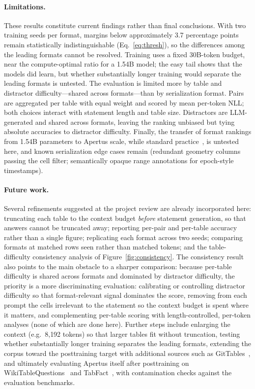 \documentclass[11pt,a4paper]{article}
\begin{document}
\paragraph{Limitations.} These results constitute current findings rather than final conclusions. With two training seeds per format, margins below approximately 3.7 percentage points remain statistically indistinguishable (Eq.~\eqref{eq:thresh}), so the differences among the leading formats cannot be resolved. Training uses a fixed 30B-token budget, near the compute-optimal ratio for a 1.54B model; the easy tail shows that the models did learn, but whether substantially longer training would separate the leading formats is untested. The evaluation is limited more by table and distractor difficulty---shared across formats---than by serialization format. Pairs are aggregated per table with equal weight and scored by mean per-token NLL; both choices interact with statement length and table size. Distractors are LLM-generated and shared across formats, leaving the ranking unbiased but tying absolute accuracies to distractor difficulty. Finally, the transfer of format rankings from 1.54B parameters to Apertus scale, while standard practice~\cite{chinchilla}, is untested here, and known serialization edge cases remain (redundant geometry columns passing the cell filter; semantically opaque range annotations for epoch-style timestamps).
\paragraph{Future work.} Several refinements suggested at the project review are already incorporated here: truncating each table to the context budget \emph{before} statement generation, so that answers cannot be truncated away; reporting per-pair and per-table accuracy rather than a single figure; replicating each format across two seeds; comparing formats at matched rows seen rather than matched tokens; and the table-difficulty consistency analysis of Figure~\ref{fig:consistency}. The consistency result also points to the main obstacle to a sharper comparison: because per-table difficulty is shared across formats and dominated by distractor difficulty, the priority is a more discriminating evaluation: calibrating or controlling distractor difficulty so that format-relevant signal dominates the score, removing from each prompt the cells irrelevant to the statement so the context budget is spent where it matters, and complementing per-table scoring with length-controlled, per-token analyses (none of which are done here). Further steps include enlarging the context (e.g.\ 8{,}192 tokens) so that larger tables fit without truncation, testing whether substantially longer training separates the leading formats, extending the corpus toward the posttraining target with additional sources such as GitTables~\cite{gittables}, and ultimately evaluating Apertus itself after posttraining on WikiTableQuestions~\cite{wtq} and TabFact~\cite{tabfact}, with contamination checks against the evaluation benchmarks.
\end{document}
